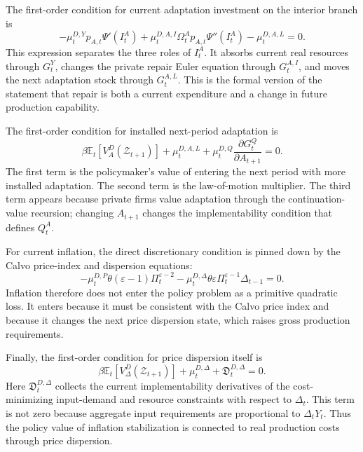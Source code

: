﻿\documentclass[12pt]{article}
\theoremstyle{remark}
\newcommand{\E}{\mathbb E}
\begin{document}
The first-order condition for current adaptation investment on the interior branch is
\begin{equation}
    -\mu_t^{D,Y}p_{A,t}\Psi'(I_t^A)
    +
    \mu_t^{D,A,I}\Omega_t^Ap_{A,t}\Psi''(I_t^A)
    -
    \mu_t^{D,A,L}
    =
    0.
    \label{eq:app_discretion_I}
\end{equation}
This expression separates the three roles of $I_t^A$. It absorbs current real resources through
$G_t^Y$, changes the private repair Euler equation through $G_t^{A,I}$, and moves the next
adaptation stock through $G_t^{A,L}$. This is the formal version of the statement that repair is
both a current expenditure and a change in future production capability.

The first-order condition for installed next-period adaptation is
\begin{equation}
    \beta
    \E_t
    \left[
        V_A^D(\mathcal Z_{t+1})
    \right]
    +
    \mu_t^{D,A,L}
    +
    \mu_t^{D,Q}
    \frac{\partial G_t^Q}{\partial A_{t+1}}
    =
    0.
    \label{eq:app_discretion_A_next}
\end{equation}
The first term is the policymaker's value of entering the next period with more installed
adaptation. The second term is the law-of-motion multiplier. The third term appears because
private firms value adaptation through the continuation-value recursion; changing $A_{t+1}$ changes
the implementability condition that defines $Q_t^A$.

For current inflation, the direct discretionary condition is pinned down by the Calvo price-index
and dispersion equations:
\begin{equation}
    -\mu_t^{D,P}\theta(\varepsilon-1)\Pi_t^{\varepsilon-2}
    -
    \mu_t^{D,\Delta}\theta\varepsilon\Pi_t^{\varepsilon-1}\Delta_{t-1}
    =
    0.
    \label{eq:app_discretion_pi}
\end{equation}
Inflation therefore does not enter the policy problem as a primitive quadratic loss. It enters
because it must be consistent with the Calvo price index and because it changes the next price
dispersion state, which raises gross production requirements.

Finally, the first-order condition for price dispersion itself is
\begin{equation}
    \beta
    \E_t
    \left[
        V_\Delta^D(\mathcal Z_{t+1})
    \right]
    +
    \mu_t^{D,\Delta}
    +
    \mathfrak D_t^{D,\Delta}
    =
    0.
    \label{eq:app_discretion_Delta}
\end{equation}
Here $\mathfrak D_t^{D,\Delta}$ collects the current implementability derivatives of the
cost-minimizing input-demand and resource constraints with respect to $\Delta_t$. This term is not
zero because aggregate input requirements are proportional to $\Delta_tY_t$. Thus the policy value
of inflation stabilization is connected to real production costs through price dispersion.
\end{document}
